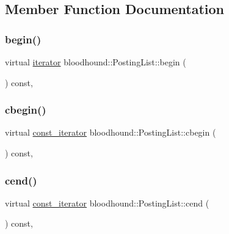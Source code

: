 \subsection{Member Function Documentation}
\mbox{\label{classbloodhound_1_1PostingList_a274f57f133cd6763e0d8cc3e00fa1be3}} 
\subsubsection{\texorpdfstring{begin()}{begin()}}
{\footnotesize\ttfamily virtual \mbox{\hyperlink{structbloodhound_1_1PostingList_1_1iterator}{iterator}} bloodhound\+::\+Posting\+List\+::begin (\begin{DoxyParamCaption}{ }\end{DoxyParamCaption}) const\hspace{0.3cm}{\ttfamily [inline]}, {\ttfamily [virtual]}}

\mbox{\label{classbloodhound_1_1PostingList_a44980317210bfe6c9f7d59dbea1cbd4a}} 
\subsubsection{\texorpdfstring{cbegin()}{cbegin()}}
{\footnotesize\ttfamily virtual \mbox{\hyperlink{structbloodhound_1_1PostingList_1_1const__iterator}{const\+\_\+iterator}} bloodhound\+::\+Posting\+List\+::cbegin (\begin{DoxyParamCaption}{ }\end{DoxyParamCaption}) const\hspace{0.3cm}{\ttfamily [inline]}, {\ttfamily [virtual]}}

\mbox{\label{classbloodhound_1_1PostingList_a7eca0ae1f54ddc48757a4fb3c0b885ce}} 
\subsubsection{\texorpdfstring{cend()}{cend()}}
{\footnotesize\ttfamily virtual \mbox{\hyperlink{structbloodhound_1_1PostingList_1_1const__iterator}{const\+\_\+iterator}} bloodhound\+::\+Posting\+List\+::cend (\begin{DoxyParamCaption}{ }\end{DoxyParamCaption}) const\hspace{0.3cm}{\ttfamily [inline]}, {\ttfamily [virtual]}}

